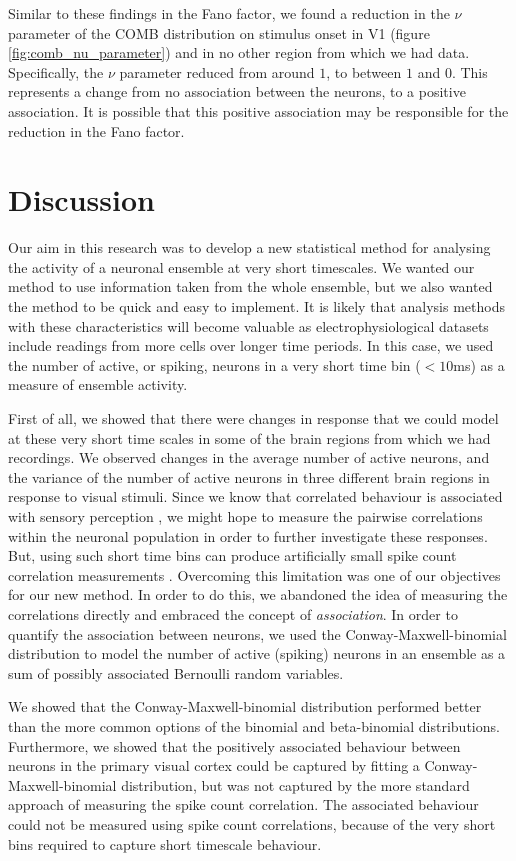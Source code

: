   Similar to these findings in the Fano factor, we found a reduction in the $\nu$ parameter of the COMB distribution on stimulus onset in V1 (figure \ref{fig:comb_nu_parameter}) and in no other region from which we had data. Specifically, the $\nu$ parameter reduced from around $1$, to between $1$ and $0$. This represents a change from no association between the neurons, to a positive association. It is possible that this positive association may be responsible for the reduction in the Fano factor.

\section{Discussion}
Our aim in this research was to develop a new statistical method for analysing the activity of a neuronal ensemble at very short timescales. We wanted our method to use information taken from the whole ensemble, but we also wanted the method to be quick and easy to implement. It is likely that analysis methods with these characteristics will become valuable as electrophysiological datasets include readings from more cells over longer time periods. In this case, we used the number of active, or spiking, neurons in a very short time bin ($<10$ms) as a measure of ensemble activity.

First of all, we showed that there were changes in response that we could model at these very short time scales in some of the brain regions from which we had recordings. We observed changes in the average number of active neurons, and the variance of the number of active neurons in three different brain regions in response to visual stimuli. Since we know that correlated behaviour is associated with sensory perception \parencite{decharms}, we might hope to measure the pairwise correlations within the neuronal population in order to further investigate these responses. But, using such short time bins can produce artificially small spike count correlation measurements \parencite{cohen1}. Overcoming this limitation was one of our objectives for our new method. In order to do this, we abandoned the idea of measuring the correlations directly and embraced the concept of \textit{association}. In order to quantify the association between neurons, we used the Conway-Maxwell-binomial distribution to model the number of active (spiking) neurons in an ensemble as a sum of possibly associated Bernoulli random variables.

We showed that the Conway-Maxwell-binomial distribution performed better than the more common options of the binomial and beta-binomial distributions. Furthermore, we showed that the positively associated behaviour between neurons in the primary visual cortex could be captured by fitting a Conway-Maxwell-binomial distribution, but was not captured by the more standard approach of measuring the spike count correlation. The associated behaviour could not be measured using spike count correlations, because of the very short bins required to capture short timescale behaviour.

